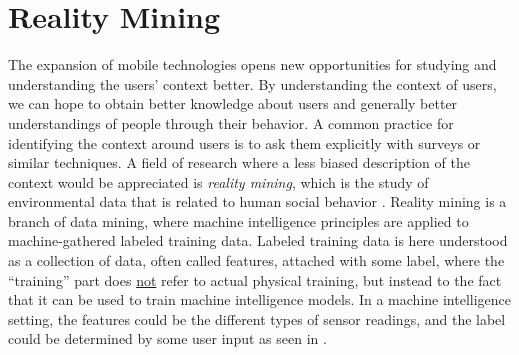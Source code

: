 
\section{Reality Mining}
\label{sec:reality_mining}
The expansion of mobile technologies opens new opportunities for studying and understanding the users' context better. By understanding the context of users, we can hope to obtain better knowledge about users and generally better understandings of people through their behavior. A common practice for identifying the context around users is to ask them explicitly with surveys or similar techniques. A field of research where a less biased description of the context would be appreciated is \emph{reality mining}, which is the study of environmental data that is related to human social behavior \parencite{madan2009_reality_mining_privacy}. Reality mining is a branch of data mining, where machine intelligence principles are applied to machine-gathered labeled training data. Labeled training data is here understood as a collection of data, often called features, attached with some label, where the ``training'' part does \underline{not} refer to actual physical training, but instead to the fact that it can be used to train machine intelligence models. In a machine intelligence setting, the features could be the different types of sensor readings, and the label could be determined by some user input as seen in .
\\
\begin{table}[!htbp]
    \centering
    \caption{Example of labeled training data.}
    \label{tab:labeled_training_data}
\end{table}

